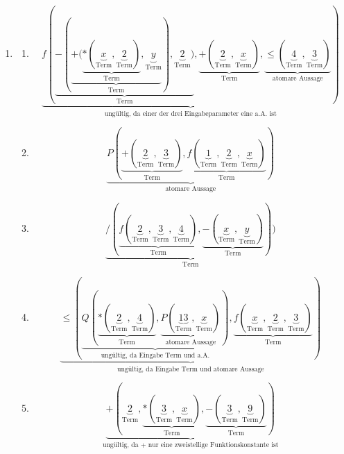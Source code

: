 \documentclass[a4paper]{article}
\begin{document}
\begin{enumerate}
		\item
		\begin{enumerate}
			\item
			\begin{equation*}
				\underbrace{f(\underbrace{-(\underbrace{+(\underbrace{*(\underbrace{x}_{\text{Term}}, \underbrace{2}_{\text{Term}})}_{\text{Term}}, \underbrace{y}_{\text{Term}}}_{\text{Term}}), \underbrace{2}_{\text{Term}})}_{\text{Term}}, \underbrace{+(\underbrace{2}_{\text{Term}}, \underbrace{x}_{\text{Term}})}_{\text{Term}}, \underbrace{\leq(\underbrace{4}_{\text{Term}}, \underbrace{3}_{\text{Term}})}_{\text{atomare Aussage}})}_{\text{ungültig, da einer der drei Eingabeparameter eine a.A. ist}}
			\end{equation*}
			
			\item
			\begin{equation*}
				\underbrace{P(\underbrace{+(\underbrace{2}_{\text{Term}}, \underbrace{3}_{\text{Term}})}_{\text{Term}}, \underbrace{f(\underbrace{1}_{\text{Term}}, \underbrace{2}_{\text{Term}}, \underbrace{x}_{\text{Term}})}_{\text{Term}})}_{\text{atomare Aussage}}
			\end{equation*}
			
			\item
			\begin{equation*}
				\underbrace{/(\underbrace{f(\underbrace{2}_{\text{Term}}, \underbrace{3}_{\text{Term}}, \underbrace{4}_{\text{Term}})}_{\text{Term}}, \underbrace{-(\underbrace{x}_{\text{Term}}, \underbrace{y}_{\text{Term}})}_{\text{Term}}))}_{\text{Term}}
			\end{equation*}
			
			\item
			\begin{equation*}
				\underbrace{\leq(\underbrace{Q(\underbrace{*(\underbrace{2}_{\text{Term}}, \underbrace{4}_{\text{Term}})}_{\text{Term}}, \underbrace{P(\underbrace{13}_{\text{Term}}, \underbrace{x}_{\text{Term}})}_{\text{atomare Aussage}})}_{\text{ungültig, da Eingabe Term und a.A.}}, \underbrace{f(\underbrace{x}_{\text{Term}}, \underbrace{2}_{\text{Term}}, \underbrace{3}_{\text{Term}})}_{\text{Term}})}_{\text{ungültig, da Eingabe Term und atomare Aussage}}
			\end{equation*}
			
			\item
			\begin{equation*}
				\underbrace{+(\underbrace{2}_{\text{Term}}, \underbrace{*(\underbrace{3}_{\text{Term}}, \underbrace{x}_{\text{Term}})}_{\text{Term}}, \underbrace{-(\underbrace{3}_{\text{Term}}, \underbrace{9}_{\text{Term}})}_{\text{Term}})}_{\text{ungültig, da + nur eine zweistellige Funktionskonstante ist}}
			\end{equation*}
			

\end{enumerate}
\end{enumerate}
\end{document}
